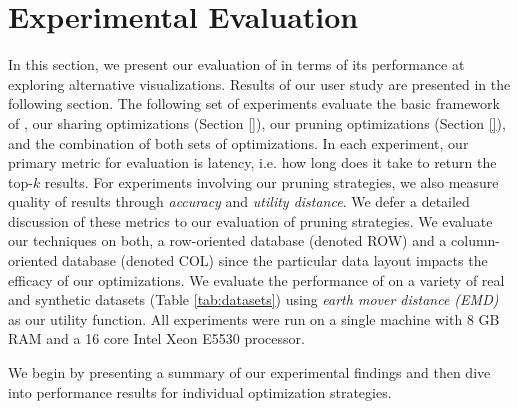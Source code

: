 
\section{Experimental Evaluation}
\label{sec:experiments}
 
In this section, we present our evaluation of \SeeDB in terms of its performance 
at exploring alternative visualizations. 
Results of our user study are presented in the following section.
The following set of experiments evaluate the basic framework of \SeeDB, our sharing optimizations 
(Section \ref{}), our pruning optimizations (Section \ref{}), and the combination of both sets of optimizations.
In each experiment, our primary metric for evaluation is latency, i.e. how long does it take \SeeDB to return the top-$k$ results. 
For experiments involving our pruning strategies, we also measure quality of results through {\it accuracy} and {\it utility distance}. 
We defer a detailed discussion of these metrics to our evaluation of pruning strategies.
We evaluate our techniques on both, a row-oriented database (denoted ROW) and a
column-oriented database (denoted COL) since the particular data layout impacts the efficacy of our optimizations.
We evaluate the performance of \SeeDB on a variety of real and synthetic datasets (Table 
\ref{tab:datasets}) using {\it earth mover distance (EMD)} as our utility function.
All experiments were run on a single machine with 8 GB RAM and a 16 core Intel 
Xeon E5530 processor. 

We begin by presenting a summary of our experimental findings and then dive into performance results for individual optimization strategies.



